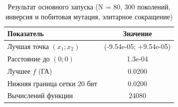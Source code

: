 \begin{table}[H]
\caption{Результат основного запуска (N = 80, 300 поколений, инверсия и побитовая мутация, элитарное сокращение)}
\label{tab:result}
\centering
\small
\begin{tabular}{lc}
\toprule
Показатель & Значение \\
\midrule
Лучшая точка $(x_1; x_2)$ & (-9.54e-05; +9.54e-05) \\
Расстояние до $(0; 0)$ & 1.3e-04 \\
Лучшее $f$ (ГА) & 0.0200 \\
Нижняя граница сетки 20 бит & 0.0200 \\
Вычислений функции & 24080 \\
\bottomrule
\end{tabular}
\end{table}
